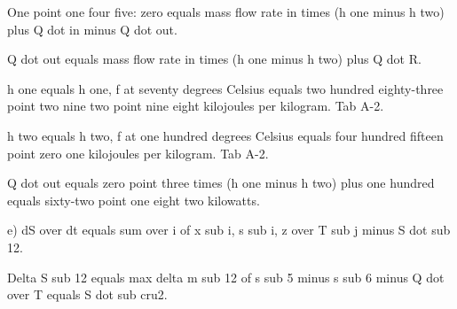One point one four five: zero equals mass flow rate in times (h one minus h two) plus Q dot in minus Q dot out.

Q dot out equals mass flow rate in times (h one minus h two) plus Q dot R.

h one equals h one, f at seventy degrees Celsius equals two hundred eighty-three point two nine two point nine eight kilojoules per kilogram. Tab A-2.

h two equals h two, f at one hundred degrees Celsius equals four hundred fifteen point zero one kilojoules per kilogram. Tab A-2.

Q dot out equals zero point three times (h one minus h two) plus one hundred equals sixty-two point one eight two kilowatts.

e) dS over dt equals sum over i of x sub i, s sub i, z over T sub j minus S dot sub 12.

Delta S sub 12 equals max delta m sub 12 of s sub 5 minus s sub 6 minus Q dot over T equals S dot sub cru2.